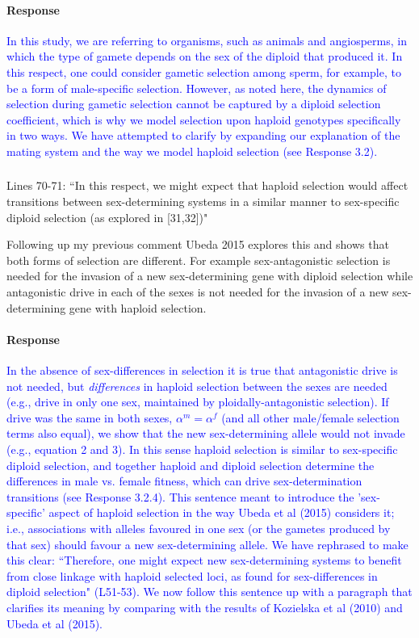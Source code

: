 \documentclass[10pt,letterpaper]{article}
\begin{document}
\noindent\paragraph{Response}
\textcolor{blue}{In this study, we are referring to organisms, such as animals and angiosperms, in which the type of gamete depends on the sex of the diploid that produced it. In this respect, one could consider gametic selection among sperm, for example, to be a form of male-specific selection. However, as noted here, the dynamics of selection during gametic selection cannot be captured by a diploid selection coefficient, which is why we model selection upon haploid genotypes specifically in two ways. }
\textcolor{blue}{
We have attempted to clarify by expanding our explanation of the mating system and the way we model haploid selection (see Response 3.2).}

\noindent\subsubsection{}
Lines 70-71: ``In this respect, we might expect that haploid selection would affect transitions between sex-determining systems in a similar manner to sex-specific diploid selection (as explored in [31,32])" 

Following up my previous comment Ubeda 2015 explores this and shows that both forms of selection are different. For example sex-antagonistic selection is needed for the invasion of a new sex-determining gene with diploid selection while antagonistic drive in each of the sexes is not needed for the invasion of a new sex-determining gene with haploid selection.

\noindent\paragraph{Response}
\textcolor{blue}{In the absence of sex-differences in selection it is true that antagonistic drive is not needed, but \textit{differences} in haploid selection between the sexes are needed (e.g., drive in only one sex, maintained by ploidally-antagonistic selection). 
If drive was the same in both sexes, $\alpha^{m}=\alpha^{f}$ (and all other male/female selection terms also equal), we show that the new sex-determining allele would not invade (e.g., equation 2 and 3). 
In this sense haploid selection is similar to sex-specific diploid selection, and together haploid and diploid selection determine the differences in male vs. female fitness, which can drive sex-determination transitions (see Response 3.2.4).
This sentence meant to introduce the 'sex-specific' aspect of haploid selection in the way Ubeda et al (2015) considers it; i.e., associations with alleles favoured in one sex (or the gametes produced by that sex) should favour a new sex-determining allele.
We have rephrased to make this clear: ``Therefore, one might expect new sex-determining systems to benefit from close linkage with haploid selected loci, as found for sex-differences in diploid selection" (L51-53).
We now follow this sentence up with a paragraph that clarifies its meaning by comparing with the results of Kozielska et al (2010) and Ubeda et al (2015).}
\end{document}
